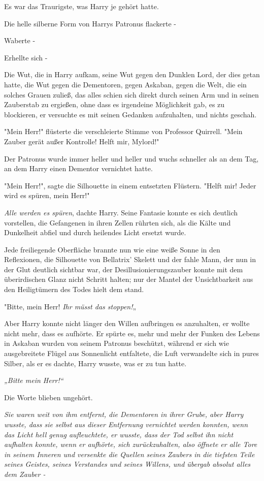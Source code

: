 {Es war das Traurigste, was Harry je gehört hatte.

Die helle silberne Form von Harrys Patronus flackerte -

Waberte -

Erhellte sich -

Die Wut, die in Harry aufkam, seine Wut gegen den Dunklen Lord, der dies getan hatte, die Wut gegen die Dementoren, gegen Askaban, gegen die Welt, die ein solches Grauen zuließ, das alles schien sich direkt durch seinen Arm und in seinen Zauberstab zu ergießen, ohne dass es irgendeine Möglichkeit gab, es zu blockieren, er versuchte es mit seinen Gedanken aufzuhalten, und nichts geschah.

"Mein Herr!" flüsterte die verschleierte Stimme von Professor Quirrell. "Mein Zauber gerät außer Kontrolle! Helft mir, Mylord!"

Der Patronus wurde immer heller und heller und wuchs schneller als an dem Tag, an dem Harry einen Dementor vernichtet hatte.

"Mein Herr!", sagte die Silhouette in einem entsetzten Flüstern. "Helft mir! Jeder wird es spüren, mein Herr!"

\emph{Alle werden es spüren}, dachte Harry. Seine Fantasie konnte es sich deutlich vorstellen, die Gefangenen in ihren Zellen rührten sich, als die Kälte und Dunkelheit abfiel und durch heilendes Licht ersetzt wurde.

Jede freiliegende Oberfläche brannte nun wie eine weiße Sonne in den Reflexionen, die Silhouette von Bellatrix' Skelett und der fahle Mann, der nun in der Glut deutlich sichtbar war, der Desillusionierungszauber konnte mit dem überirdischen Glanz nicht Schritt halten; nur der Mantel der Unsichtbarkeit aus den Heiligtümern des Todes hielt dem stand.

"Bitte, mein Herr! \emph{Ihr müsst das stoppen!}„

Aber Harry konnte nicht länger den Willen aufbringen es anzuhalten, er wollte nicht mehr, dass es aufhörte. Er spürte es, mehr und mehr der Funken des Lebens in Askaban wurden von seinem Patronus beschützt, während er sich wie ausgebreitete Flügel aus Sonnenlicht entfaltete, die Luft verwandelte sich in pures Silber, als er es dachte, Harry wusste, was er zu tun hatte.

\emph{\emph{„Bitte mein Herr!“}}

Die Worte blieben ungehört.

\emph{\emph{Sie waren weit von ihm entfernt, die Dementoren in ihrer Grube, aber Harry wusste, dass sie selbst aus dieser Entfernung vernichtet werden konnten, wenn das Licht hell genug aufleuchtete, er wusste, dass der Tod selbst ihn nicht aufhalten konnte, wenn er aufhörte, sich zurückzuhalten, also öffnete er alle Tore in seinem Inneren und versenkte die Quellen seines Zaubers in die tiefsten Teile seines Geistes, seines Verstandes und seines Willens, und übergab absolut alles dem Zauber -}}

}
